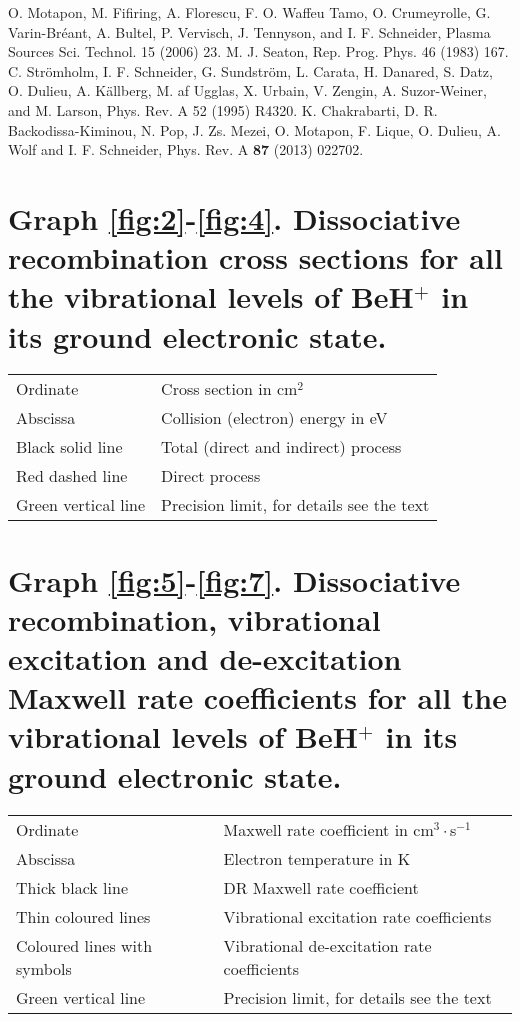\documentclass[reviewcopy]{elsarticle}
\begin{document}
\begin{thebibliography}{999}
 O. Motapon, M. Fifiring, A. Florescu, F. O. Waffeu Tamo, O. Crumeyrolle, G. Varin-Br\'eant, A. Bultel, P. Vervisch, J. Tennyson, and I. F. Schneider, Plasma Sources Sci. Technol. 15 (2006) 23.
 M. J. Seaton, Rep. Prog. Phys. 46 (1983) 167.
 C. Str\"omholm, I. F. Schneider, G. Sundstr\"om, L. Carata, H. Danared, S. Datz, O. Dulieu, A. K\"allberg, M. af Ugglas, X. Urbain, V. Zengin, A. Suzor-Weiner, and M. Larson, Phys. Rev. A 52 (1995) R4320.
 K. Chakrabarti, D. R. Backodissa-Kiminou, N. Pop, J. Zs. Mezei, O. Motapon, F. Lique, O. Dulieu, A. Wolf and I. F. Schneider, Phys. Rev. A {\bf 87} (2013) 022702.
\end{thebibliography}

\newpage

\GraphExplanation

\section*{Graph \ref{fig:2}-\ref{fig:4}. Dissociative recombination cross sections for all the vibrational levels of BeH$^+$ in its ground electronic state.}
\begin{tabular}{@{}p{2in}p{6in}@{}}
Ordinate		& Cross section in cm$^2$ \\
Abscissa	& Collision (electron) energy in eV\\
Black solid line	& Total (direct and indirect) process\\
Red dashed line	& Direct process\\
Green vertical line	& Precision limit, for details see the text\\
\end{tabular}

\section*{Graph \ref{fig:5}-\ref{fig:7}. Dissociative recombination, vibrational excitation and de-excitation  Maxwell rate coefficients for  all the vibrational levels of BeH$^+$ in its ground electronic state.}
\begin{tabular}{@{}p{2in}p{6in}@{}}
Ordinate		& Maxwell rate coefficient in cm$^3\cdot$s$^{-1}$ \\
Abscissa	& Electron temperature in K\\
Thick black line	& DR Maxwell rate coefficient \\
Thin coloured lines	& Vibrational excitation rate coefficients\\
Coloured lines	with symbols & Vibrational de-excitation rate coefficients\\
Green vertical line	& Precision limit, for details see the text\\
\end{tabular}
\end{document}
